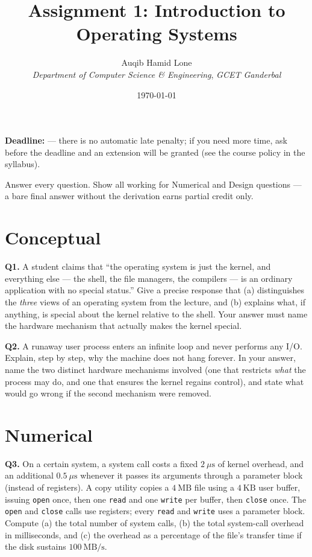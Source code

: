 \documentclass[11pt]{article}
\title{Assignment 1: Introduction to Operating Systems}
\author{Auqib Hamid Lone\\[0.3em]
  \emph{Department of Computer Science \& Engineering}, \emph{GCET Ganderbal}}
\date{\today}
\begin{document}
\maketitle

\noindent\textbf{Deadline:}  --- there is no automatic late penalty; if you need more time, ask before the deadline and an extension will be granted (see the course policy in the syllabus).

\noindent Answer every question. Show all working for Numerical and Design questions --- a bare final answer without the derivation earns partial credit only.

\section{Conceptual}

\textbf{Q1.} A student claims that ``the operating system is just the kernel, and everything else --- the shell, the file managers, the compilers --- is an ordinary application with no special status.'' Give a precise response that (a) distinguishes the \emph{three} views of an operating system from the lecture, and (b) explains what, if anything, is special about the kernel relative to the shell. Your answer must name the hardware mechanism that actually makes the kernel special.

\textbf{Q2.} A runaway user process enters an infinite loop and never performs any I/O. Explain, step by step, why the machine does not hang forever. In your answer, name the two distinct hardware mechanisms involved (one that restricts \emph{what} the process may do, and one that ensures the kernel regains control), and state what would go wrong if the second mechanism were removed.

\section{Numerical}

\textbf{Q3.} On a certain system, a system call costs a fixed $2\ \mu\text{s}$ of kernel overhead, and an additional $0.5\ \mu\text{s}$ whenever it passes its arguments through a parameter block (instead of registers). A copy utility copies a $4\ \text{MB}$ file using a $4\ \text{KB}$ user buffer, issuing \texttt{open} once, then one \texttt{read} and one \texttt{write} per buffer, then \texttt{close} once. The \texttt{open} and \texttt{close} calls use registers; every \texttt{read} and \texttt{write} uses a parameter block. Compute (a) the total number of system calls, (b) the total system-call overhead in milliseconds, and (c) the overhead as a percentage of the file's transfer time if the disk sustains $100\ \text{MB/s}$.
\end{document}
